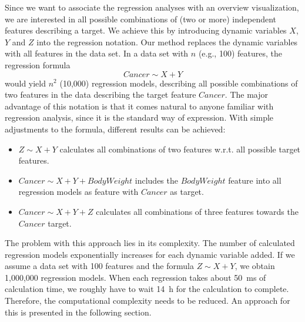 \documentclass[journal]{style/vgtc} 			          %
\begin{document}
Since we want to associate the regression analyses with an overview visualization, we are interested in all possible combinations of (two or more) independent features describing a target.
We achieve this by introducing dynamic variables $X$, $Y$ and $Z$ into the regression notation.
Our method replaces the dynamic variables with all features in the data set.
In a data set with $n$ (e.g., 100) features, the regression formula
\begin{equation}
Cancer \sim X + Y
\end{equation}
would yield $n^2$ (10,000) regression models, describing all possible combinations of two features in the data describing the target feature $Cancer$.
The major advantage of this notation is that it comes natural to anyone familiar with regression analysis, since it is the standard way of expression.
With simple adjustments to the formula, different results can be achieved:
\begin{itemize}
	\item $Z \sim X + Y$ calculates all combinations of two features w.r.t. all possible target features.
	\item $Cancer \sim X + Y + BodyWeight$ includes the $BodyWeight$ feature into all regression models as feature with $Cancer$ as target.
	\item $Cancer \sim X + Y + Z$ calculates all combinations of three features towards the $Cancer$ target.
\end{itemize}
The problem with this approach lies in its complexity.
The number of calculated regression models exponentially increases for each dynamic variable added.
If we assume a data set with 100 features and the formula $Z \sim X + Y$, we obtain 1,000,000 regression models.
When each regression takes about 50~ms of calculation time, we roughly have to wait 14~h for the calculation to complete.
Therefore, the computational complexity needs to be reduced.
An approach for this is presented in the following section.
\end{document}
